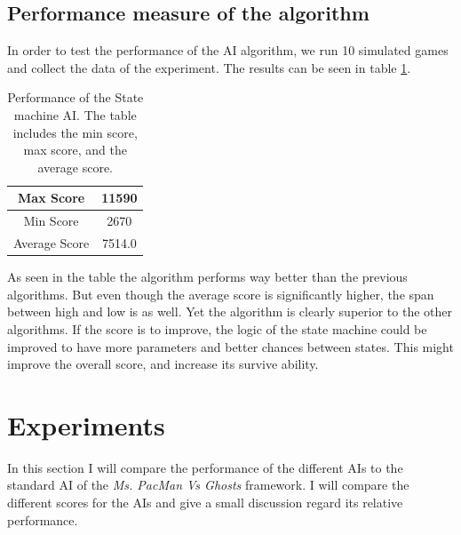 \documentclass[conference,compsoc]{IEEEtran}
\begin{document}
\subsection{Performance measure of the algorithm}
In order to test the performance of the AI algorithm, we run 10 simulated games and collect the data of the experiment. The results can be seen in table \ref{tab:statePer}.
\begin{table}[h]
\begin{center}
\begin{tabular}{|c|c|}
\hline
Max Score & 11590\\
\hline
Min Score & 2670\\
\hline
Average Score & 7514.0\\
\hline
\end{tabular}
\end{center}
\caption{Performance of the State machine AI. The table includes the min score, max score, and the average score.}
\label{tab:statePer}
\end{table}
As seen in the table the algorithm performs way better than the previous algorithms. But even though the average score is significantly higher, the span between high and low is as well. Yet the algorithm is clearly superior to the other algorithms. 
If the score is to improve, the logic of the state machine could be improved to have more parameters and better chances between states. This might improve the overall score, and increase its survive ability.

\section{Experiments}
In this section I will compare the performance of the different AIs to the standard AI of the \textit{Ms. PacMan Vs Ghosts} framework.
I will compare the different scores for the AIs and give a small discussion regard its relative performance. 
\end{document}
